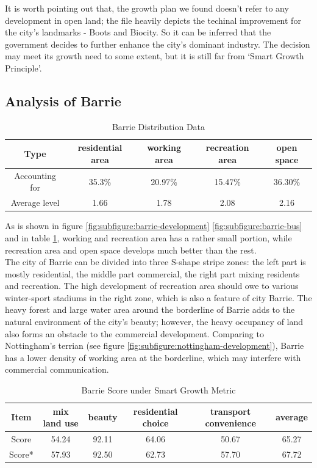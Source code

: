 It is worth pointing out that, the growth plan we found doesn't refer to any development in open land; the file heavily depicts the techinal improvement for the city's landmarks - Boots and Biocity.
So it can be inferred that the government decides to further enhance the city's dominant industry.
The decision may meet its growth need to some extent, but it is still far from `Smart Growth Principle'.

\subsection{Analysis of Barrie}
\begin{table}[t]
\centering
  \begin{tabular}{c|cccc}
    \hline
    Type & residential area & working area & recreation area & open space \\
    \hline
    Accounting for & 35.3\% & 20.97\% & 15.47\% & 36.30\% \\
    \hline
    Average level & 1.66 & 1.78 & 2.08 & 2.16 \\
    \hline
  \end{tabular}
  \caption{Barrie Distribution Data}
  \label{tab:barrie-data}
\end{table}

As is shown in figure \ref{fig:subfigure:barrie-development} \ref{fig:subfigure:barrie-bus} and in table \ref{tab:barrie-data}, working and recreation area has a rather small portion, while recreation area and open space develops much better than the rest.\\

The city of Barrie can be divided into three S-shape stripe zones: the left part is mostly residential, the middle part commercial, the right part mixing residents and recreation.
The high development of recreation area should owe to various winter-sport stadiums in the right zone, which is also a feature of city Barrie.
The heavy forest and large water area around the borderline of Barrie adds to the natural environment of the city's beauty; however, the heavy occupancy of land also forms an obstacle to the commercial development.
Comparing to Nottingham's terrian (see figure \ref{fig:subfigure:nottingham-development}), Barrie has a lower density of working area at the borderline, which may interfere with commercial communication.\\
\begin{table}[t]
\centering
  \begin{tabular}{c|cccc|c}
    \hline
    Item & mix land use & beauty & residential choice & transport convenience & average \\
    \hline
    Score & 54.24 & 92.11 & 64.06 & 50.67 & 65.27 \\
    Score* & 57.93 & 92.50 & 62.73 & 57.70 & 67.72\\
    \hline
  \end{tabular}
  \caption{Barrie Score under Smart Growth Metric}
  \label{tab:barrie-score}
\end{table}

